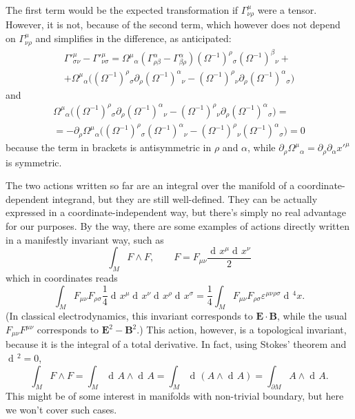 \documentclass[a4paper,12pt]{book}
\renewcommand{\vec}{\mathbf}
\newcommand{\dd}{\mathop{\mathrm{d}\!}{}}
\theoremstyle{definition}
\theoremstyle{remark}
\let\oldcdot\cdot
\renewcommand{\cdot}{\! \oldcdot \!}
\begin{document}
The first term would be the expected transformation if $\Gamma^\mu_{\nu\rho}$ were a tensor. However, it is not, because of the second term, which however does not depend on $\Gamma^\mu_{\nu\rho}$ and simplifies in the difference, as anticipated:
\begin{multline*}\Gamma'^\mu_{\sigma\nu}-\Gamma'^\mu_{\nu\sigma}=\Omega^\mu{}_\alpha(\Gamma^\alpha_{\rho\beta}-\Gamma^\alpha_{\beta\rho})(\Omega^{-1})^\rho{}_\sigma(\Omega^{-1})^\beta{}_\nu+\\
+\Omega^\mu{}_\alpha\bigl((\Omega^{-1})^\rho{}_\sigma\partial_\rho(\Omega^{-1})^\alpha{}_\nu-(\Omega^{-1})^\rho{}_\nu\partial_\rho(\Omega^{-1})^\alpha{}_\sigma\bigr)
\end{multline*}
and
\begin{multline*}
\Omega^\mu{}_\alpha\bigl((\Omega^{-1})^\rho{}_\sigma\partial_\rho(\Omega^{-1})^\alpha{}_\nu-(\Omega^{-1})^\rho{}_\nu\partial_\rho(\Omega^{-1})^\alpha{}_\sigma\bigr)=\\
=-\partial_\rho\Omega^\mu{}_\alpha\bigl((\Omega^{-1})^\rho{}_\sigma(\Omega^{-1})^\alpha{}_\nu-(\Omega^{-1})^\rho{}_\nu(\Omega^{-1})^\alpha{}_\sigma\bigr)=0
\end{multline*}
because the term in brackets is antisymmetric in $\rho$ and $\alpha$, while $\partial_\rho\Omega^\mu{}_\alpha=\partial_\rho\partial_\alpha x'^\mu$ is symmetric.

The two actions written so far are an integral over the manifold of a coordinate-dependent integrand, but they are still well-defined. They can be actually expressed in a coordinate-independent way, but there's simply no real advantage for our purposes. By the way, there are some examples of actions directly written in a manifestly invariant way, such as
\[\int_MF\wedge F,\qquad F=F_{\mu\nu}\frac{\dd x^\mu\dd x^\nu}{2}\]
which in coordinates reads
\[\int_MF_{\mu\nu}F_{\rho\sigma}\frac{1}{4}\dd x^\mu\dd x^\nu\dd x^\rho\dd x^\sigma=\frac{1}{4}\int_MF_{\mu\nu}F_{\rho\sigma}\varepsilon^{\mu\nu\rho\sigma}\dd^4x.\]
(In classical electrodynamics, this invariant corresponds to $\vec E\cdot \vec B$, while the usual $F_{\mu\nu}F^{\mu\nu}$ corresponds to $\vec E^2-\vec B^2$.) This action, however, is a topological invariant, because it is the integral of a total derivative. In fact, using Stokes' theorem and $\dd^2=0$,
\[\int_MF\wedge F=\int_M\dd A\wedge\dd A=\int_M\dd(A\wedge\dd A)=\int_{\partial M}A\wedge\dd A.\]
This might be of some interest in manifolds with non-trivial boundary, but here we won't cover such cases.
\end{document}
